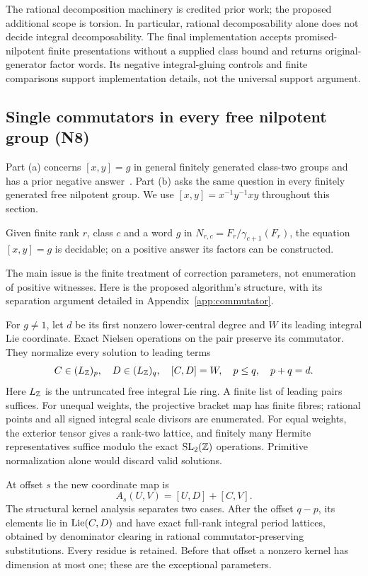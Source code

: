 The rational decomposition machinery is credited prior work; the
proposed additional scope is torsion. In particular, rational
decomposability alone does not decide integral decomposability. The
final implementation accepts promised-nilpotent finite presentations
without a supplied class bound and returns original-generator factor
words. Its negative integral-gluing controls and finite comparisons
support implementation details, not the universal support argument.

\subsection{Single commutators in every free nilpotent group (N8)}\label{sec:n8}
Part (a) concerns $[x,y]=g$ in general finitely generated class-two
groups and has a prior negative answer~\cite{romankov2016}. Part (b) asks the same question
in every finitely generated free nilpotent group. We use
$[x,y]=x^{-1}y^{-1}xy$ throughout this section.

\begin{theorem}\label{prop:n8}
Given finite rank $r$, class $c$ and a word $g$ in
$N_{r,c}=F_r/\gamma_{c+1}(F_r)$, the equation $[x,y]=g$ is
decidable; on a positive answer its factors can be constructed.
\end{theorem}

The main issue is the finite treatment of correction parameters, not
enumeration of positive witnesses. Here is the proposed algorithm's
structure, with its separation argument detailed in
Appendix~\ref{app:commutator}.

For $g\ne1$, let $d$ be its first nonzero lower-central degree and
$W$ its leading integral Lie coordinate. Exact Nielsen operations on
the pair preserve its commutator. They normalize every solution to
leading terms
\[
 C\in(L_\mathbb Z)_p,\quad D\in(L_\mathbb Z)_q,\quad [C,D]=W,
 \quad p\le q,\quad p+q=d.
\]
Here $L_\mathbb Z$ is the untruncated free integral Lie ring. A finite list
of leading pairs suffices. For unequal weights, the projective bracket
map has finite fibres; rational points and all signed integral scale
divisors are enumerated. For equal weights, the exterior tensor gives
a rank-two lattice, and finitely many Hermite representatives suffice
modulo the exact $\operatorname{SL}_2(\mathbb Z)$ operations. Primitive normalization alone
would discard valid solutions.

At offset $s$ the new coordinate map is
\begin{equation}\label{eq:n8-correction}
 A_s(U,V)=[U,D]+[C,V].
\end{equation}
The structural kernel analysis separates two cases. After the offset
$q-p$, its elements lie in $\operatorname{Lie}(C,D)$ and have exact full-rank
integral period lattices, obtained by denominator clearing in rational
commutator-preserving substitutions. Every residue is retained. Before
that offset a nonzero kernel has dimension at most one; these are the
exceptional parameters.

